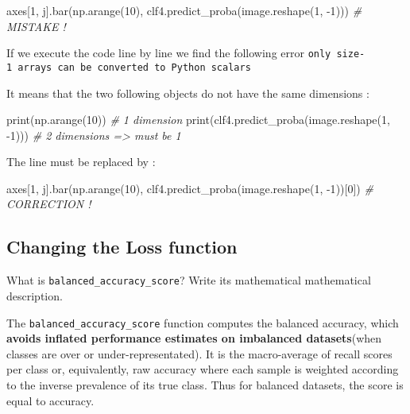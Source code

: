 \documentclass[10pt,a4paper]{article}
\newenvironment{Shaded}{\begin{snugshade}}{\end{snugshade}}
\newcommand{\BuiltInTok}[1]{#1}
\newcommand{\CommentTok}[1]{\textcolor[rgb]{0.56,0.35,0.01}{\textit{#1}}}
\newcommand{\DecValTok}[1]{\textcolor[rgb]{0.00,0.00,0.81}{#1}}
\newcommand{\NormalTok}[1]{#1}
\theoremstyle{break}
\begin{document}
\begin{Shaded}
\begin{Highlighting}[]
\NormalTok{axes[}\DecValTok{1}\NormalTok{, j].bar(np.arange(}\DecValTok{10}\NormalTok{), clf4.predict_proba(image.reshape(}\DecValTok{1}\NormalTok{, }\DecValTok{-1}\NormalTok{)))  }\CommentTok{# MISTAKE !}
\end{Highlighting}
\end{Shaded}

If we execute the code line by line we find the following error
\texttt{only\ size-1\ arrays\ can\ be\ converted\ to\ Python\ scalars}

It means that the two following objects do not have the same dimensions :

\begin{Shaded}
\begin{Highlighting}[]
\BuiltInTok{print}\NormalTok{(np.arange(}\DecValTok{10}\NormalTok{))  }\CommentTok{# 1 dimension}
\BuiltInTok{print}\NormalTok{(clf4.predict_proba(image.reshape(}\DecValTok{1}\NormalTok{, }\DecValTok{-1}\NormalTok{)))  }\CommentTok{# 2 dimensions => must be 1}
\end{Highlighting}
\end{Shaded}

The line must be replaced by :

\begin{Shaded}
\begin{Highlighting}[]
\NormalTok{axes[}\DecValTok{1}\NormalTok{, j].bar(np.arange(}\DecValTok{10}\NormalTok{), clf4.predict_proba(image.reshape(}\DecValTok{1}\NormalTok{, }\DecValTok{-1}\NormalTok{))[}\DecValTok{0}\NormalTok{]) }\CommentTok{# CORRECTION ! }
\end{Highlighting}
\end{Shaded}

\hypertarget{changing-the-loss-function}{%
\subsection{Changing the Loss function}\label{changing-the-loss-function}}

\begin{tcolorbox}

What is \texttt{balanced\_accuracy\_score}? Write its mathematical mathematical description.

\end{tcolorbox}

The \texttt{balanced\_accuracy\_score} function computes the balanced accuracy, which \textbf{avoids inflated performance estimates on imbalanced datasets}(when classes are over or under-representated). It is the macro-average of recall scores per class or, equivalently, raw accuracy where each sample is weighted according to the inverse prevalence of its true class. Thus for balanced datasets, the score is equal to accuracy.
\end{document}
